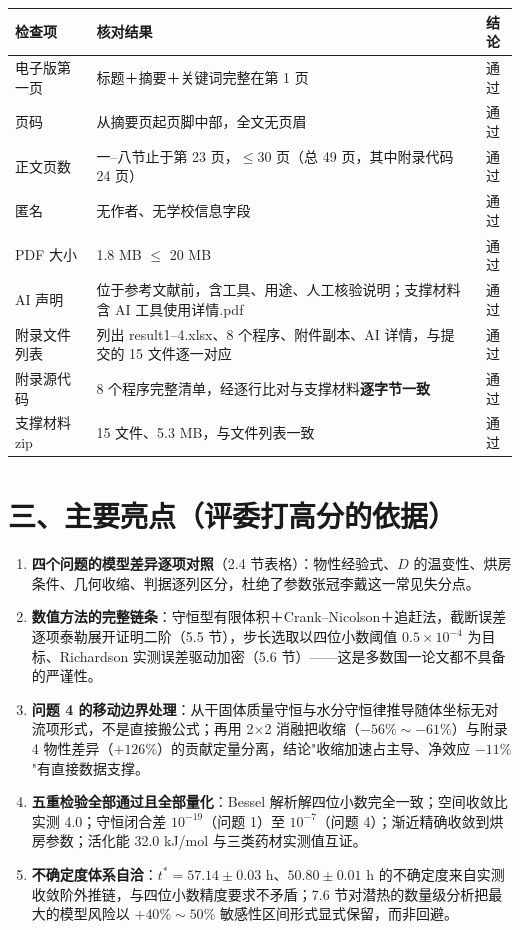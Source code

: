 \documentclass[12pt,a4paper]{ctexart}
\begin{document}
\begin{center}
{\begin{tabular}{lp{8.6cm}c}
\toprule
检查项 & 核对结果 & 结论 \\
\midrule
电子版第一页 & 标题＋摘要＋关键词完整在第 1 页 & 通过 \\
页码 & 从摘要页起页脚中部，全文无页眉 & 通过 \\
正文页数 & 一--八节止于第 23 页，$\le$30 页（总 49 页，其中附录代码 24 页） & 通过 \\
匿名 & 无作者、无学校信息字段 & 通过 \\
PDF 大小 & 1.8 MB $\le$ 20 MB & 通过 \\
AI 声明 & 位于参考文献前，含工具、用途、人工核验说明；支撑材料含 AI 工具使用详情.pdf & 通过 \\
附录文件列表 & 列出 result1--4.xlsx、8 个程序、附件副本、AI 详情，与提交的 15 文件逐一对应 & 通过 \\
附录源代码 & 8 个程序完整清单，经逐行比对与支撑材料\textbf{逐字节一致} & 通过 \\
支撑材料 zip & 15 文件、5.3 MB，与文件列表一致 & 通过 \\
\bottomrule
\end{tabular}}
\end{center}

\section{三、主要亮点（评委打高分的依据）}

\begin{enumerate}[label=（\arabic*）,leftmargin=3em]
\item \textbf{四个问题的模型差异逐项对照}（2.4 节表格）：物性经验式、$D$ 的温变性、烘房条件、几何收缩、判据逐列区分，杜绝了参数张冠李戴这一常见失分点。
\item \textbf{数值方法的完整链条}：守恒型有限体积＋Crank--Nicolson＋追赶法，截断误差逐项泰勒展开证明二阶（5.5 节），步长选取以四位小数阈值 $0.5\times10^{-4}$ 为目标、Richardson 实测误差驱动加密（5.6 节）——这是多数国一论文都不具备的严谨性。
\item \textbf{问题 4 的移动边界处理}：从干固体质量守恒与水分守恒律推导随体坐标无对流项形式，不是直接搬公式；再用 2$\times$2 消融把收缩（$-56\%\sim-61\%$）与附录 4 物性差异（$+126\%$）的贡献定量分离，结论"收缩加速占主导、净效应 $-11\%$"有直接数据支撑。
\item \textbf{五重检验全部通过且全部量化}：Bessel 解析解四位小数完全一致；空间收敛比实测 4.0；守恒闭合差 $10^{-19}$（问题 1）至 $10^{-7}$（问题 4）；渐近精确收敛到烘房参数；活化能 32.0 kJ/mol 与三类药材实测值互证。
\item \textbf{不确定度体系自洽}：$t^*=57.14\pm0.03$ h、$50.80\pm0.01$ h 的不确定度来自实测收敛阶外推链，与四位小数精度要求不矛盾；7.6 节对潜热的数量级分析把最大的模型风险以 $+40\%\sim50\%$ 敏感性区间形式显式保留，而非回避。
\end{enumerate}
\end{document}
